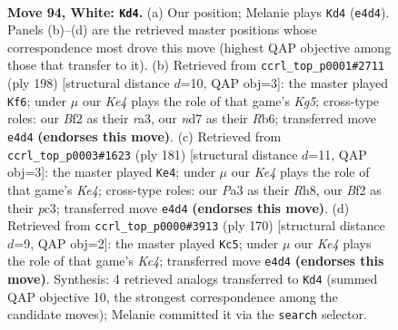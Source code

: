 \documentclass[11pt]{article}
\begin{document}
\clearpage

\begin{figure}[p]\centering
\begin{subfigure}{0.46\textwidth}\centering
\resizebox{\linewidth}{!}{%
\newchessgame
\chessboard[
  setfen={6k1/3n4/8/5P2/p3K3/P6P/5B2/8 w - - 7 94},
  showmover=false,
  pgfstyle=straightmove, color=movearrow, markmove={e4-d4}
]}
\caption{}
\end{subfigure}\hfill
\begin{subfigure}{0.46\textwidth}\centering
\resizebox{\linewidth}{!}{%
\newchessgame
\chessboard[
  setfen={8/3k4/1R6/3p1PK1/3Pp3/r7/8/8 w - - 1 100},
  showmover=false,
  pgfstyle=straightmove, color=movearrow, markmove={g5-f6}
]}
\caption{}
\end{subfigure}
\\[4pt]
\begin{subfigure}{0.46\textwidth}\centering
\resizebox{\linewidth}{!}{%
\newchessgame
\chessboard[
  setfen={7r/8/8/3pk3/8/2P5/2N1K3/8 b - - 91 91},
  showmover=false,
  pgfstyle=straightmove, color=movearrow, markmove={e5-e4}
]}
\caption{}
\end{subfigure}\hfill
\begin{subfigure}{0.46\textwidth}\centering
\resizebox{\linewidth}{!}{%
\newchessgame
\chessboard[
  setfen={5k2/2p1n3/8/4P2B/2KP4/8/8/8 w - - 31 86},
  showmover=false,
  pgfstyle=straightmove, color=movearrow, markmove={c4-c5}
]}
\caption{}
\end{subfigure}
\caption{\textbf{Move 94, White: \texttt{Kd4}.} (a) Our position; Melanie plays \texttt{Kd4} (\texttt{e4d4}). Panels (b)--(d) are the retrieved master positions whose correspondence most drove this move (highest QAP objective among those that transfer to it). (b) Retrieved from \texttt{ccrl\_top\_p0001\#2711} (ply 198) [structural distance $d$=10, QAP obj=3]: the master played \texttt{Kf6}; under $\mu$ our \emph{Ke4} plays the role of that game's \emph{Kg5}; cross-type roles: our \emph{B}f2 as their \emph{r}a3, our \emph{n}d7 as their \emph{R}b6; transferred move \texttt{e4d4} \textbf{(endorses this move)}. (c) Retrieved from \texttt{ccrl\_top\_p0003\#1623} (ply 181) [structural distance $d$=11, QAP obj=3]: the master played \texttt{Ke4}; under $\mu$ our \emph{Ke4} plays the role of that game's \emph{Ke4}; cross-type roles: our \emph{P}a3 as their \emph{R}h8, our \emph{B}f2 as their \emph{p}c3; transferred move \texttt{e4d4} \textbf{(endorses this move)}. (d) Retrieved from \texttt{ccrl\_top\_p0000\#3913} (ply 170) [structural distance $d$=9, QAP obj=2]: the master played \texttt{Kc5}; under $\mu$ our \emph{Ke4} plays the role of that game's \emph{Kc4}; transferred move \texttt{e4d4} \textbf{(endorses this move)}. Synthesis: 4 retrieved analogs transferred to \texttt{Kd4} (summed QAP objective 10, the strongest correspondence among the candidate moves); Melanie committed it via the \texttt{search} selector.}
\label{fig:thought-m186}
\end{figure}
\end{document}
